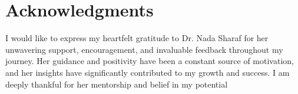 
\section*{Acknowledgments}
I would like to express my heartfelt gratitude to Dr. Nada Sharaf for her unwavering support, encouragement, and invaluable feedback throughout my journey. Her guidance and positivity have been a constant source of motivation, and her insights have significantly contributed to my growth and success. I am deeply thankful for her mentorship and belief in my potential